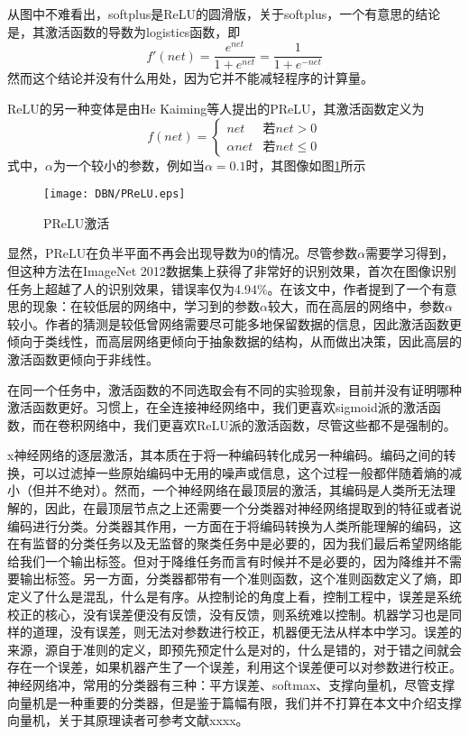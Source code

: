 从图中不难看出，softplus是ReLU的圆滑版，关于softplus，一个有意思的结论是，其激活函数的导数为logistics函数，即
\begin{equation}
f'(net) = \frac{e^{net}}{1 + e^{net}} = \frac{1}{1 + e^{-net}}
\end{equation}
然而这个结论并没有什么用处，因为它并不能减轻程序的计算量。

ReLU的另一种变体是由He Kaiming等人提出的PReLU，其激活函数定义为
\begin{equation}
f(net) = \left\{
\begin{array}{cc}
net & \text{若} net >0\\
\alpha net & \text{若} net \leq 0
\end{array}
\right.
\end{equation}
式中，$\alpha$为一个较小的参数，例如当$\alpha = 0.1$时，其图像如图\ref{img:PReLU}所示
\begin{figure}[!htbp]
\centering
\texttt{[image: DBN/PReLU.eps]}
\caption{PReLU激活}
\label{img:PReLU}
\end{figure}

显然，PReLU在负半平面不再会出现导数为0的情况。尽管参数$\alpha$需要学习得到，但这种方法在ImageNet 2012数据集上获得了非常好的识别效果，首次在图像识别任务上超越了人的识别效果，错误率仅为4.94\%。在该文中，作者提到了一个有意思的现象：在较低层的网络中，学习到的参数$\alpha$较大，而在高层的网络中，参数$\alpha$较小。作者的猜测是较低曾网络需要尽可能多地保留数据的信息，因此激活函数更倾向于类线性，而高层网络更倾向于抽象数据的结构，从而做出决策，因此高层的激活函数更倾向于非线性。

在同一个任务中，激活函数的不同选取会有不同的实验现象，目前并没有证明哪种激活函数更好。习惯上，在全连接神经网络中，我们更喜欢sigmoid派的激活函数，而在卷积网络中，我们更喜欢ReLU派的激活函数，尽管这些都不是强制的。


x神经网络的逐层激活，其本质在于将一种编码转化成另一种编码。编码之间的转换，可以过滤掉一些原始编码中无用的噪声或信息，这个过程一般都伴随着熵的减小（但并不绝对）。然而，一个神经网络在最顶层的激活，其编码是人类所无法理解的，因此，在最顶层节点之上还需要一个分类器对神经网络提取到的特征或者说编码进行分类。分类器其作用，一方面在于将编码转换为人类所能理解的编码，这在有监督的分类任务以及无监督的聚类任务中是必要的，因为我们最后希望网络能给我们一个输出标签。但对于降维任务而言有时候并不是必要的，因为降维并不需要输出标签。另一方面，分类器都带有一个准则函数，这个准则函数定义了熵，即定义了什么是混乱，什么是有序。从控制论的角度上看，控制工程中，误差是系统校正的核心，没有误差便没有反馈，没有反馈，则系统难以控制。机器学习也是同样的道理，没有误差，则无法对参数进行校正，机器便无法从样本中学习。误差的来源，源自于准则的定义，即预先预定什么是对的，什么是错的，对于错之间就会存在一个误差，如果机器产生了一个误差，利用这个误差便可以对参数进行校正。神经网络冲，常用的分类器有三种：平方误差、softmax、支撑向量机，尽管支撑向量机是一种重要的分类器，但是鉴于篇幅有限，我们并不打算在本文中介绍支撑向量机，关于其原理读者可参考文献xxxx。

